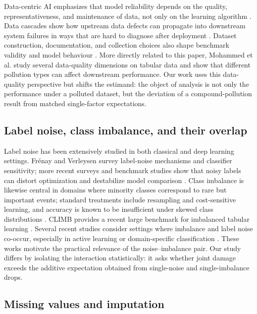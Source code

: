 \documentclass[preprint,12pt,number]{elsarticle}
\begin{document}
Data-centric AI emphasizes that model reliability depends on the quality, representativeness, and maintenance of data, not only on the learning algorithm \citep{zha2025datacentric}. Data cascades show how upstream data defects can propagate into downstream system failures in ways that are hard to diagnose after deployment \citep{sambasivan2021data}. Dataset construction, documentation, and collection choices also shape benchmark validity and model behaviour \citep{paullada2021data,hooker2021moving}. More directly related to this paper, Mohammed et al. \citep{mohammed2025effects} study several data-quality dimensions on tabular data and show that different pollution types can affect downstream performance. Our work uses this data-quality perspective but shifts the estimand: the object of analysis is not only the performance under a polluted dataset, but the deviation of a compound-pollution result from matched single-factor expectations.

\subsection{Label noise, class imbalance, and their overlap}

Label noise has been extensively studied in both classical and deep learning settings. Fr\'enay and Verleysen \citep{frenay2014classification} survey label-noise mechanisms and classifier sensitivity; more recent surveys and benchmark studies show that noisy labels can distort optimization and destabilize model comparison \citep{song2022learning,northcutt2021pervasive,wei2022learning,li2024noisy}. Class imbalance is likewise central in domains where minority classes correspond to rare but important events; standard treatments include resampling and cost-sensitive learning, and accuracy is known to be insufficient under skewed class distributions \citep{chawla2002smote,he2009learning,johnson2019survey,chen2024imbalanced}. CLIMB provides a recent large benchmark for imbalanced tabular learning \citep{liu2025climb}. Several recent studies consider settings where imbalance and label noise co-occur, especially in active learning or domain-specific classification \citep{nuggehalli2024direct,khanal2024active}. These works motivate the practical relevance of the noise--imbalance pair. Our study differs by isolating the interaction statistically: it asks whether joint damage exceeds the additive expectation obtained from single-noise and single-imbalance drops.

\subsection{Missing values and imputation}
\end{document}
